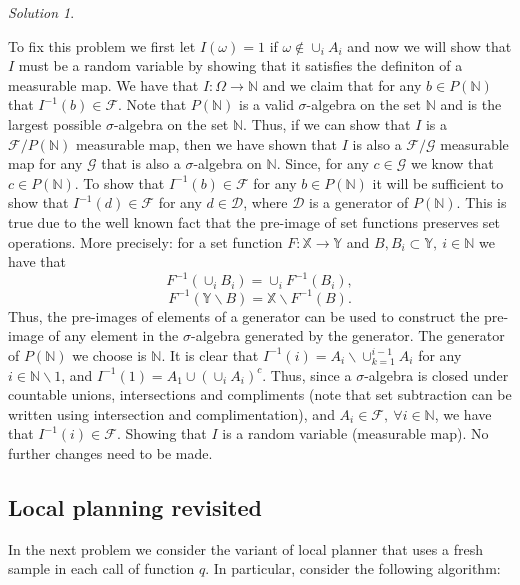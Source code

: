 \documentclass{article}
\DeclareMathOperator*{\1}{\mathbbm{1}}
\newcommand{\0}{\mathbf{0}}
\theoremstyle{definition}
\theoremstyle{remark}
\newtheorem*{solution*}{Solution}
\begin{document}
\begin{solution*}
\begin{enumerate}
  To fix this problem we first let $I(\omega) = 1$ if $\omega\not\in \cup_i A_i$ and now we will show that $I$ must be a random variable by showing that it satisfies the definiton of a measurable map.
  We have that $I: \Omega \to \mathbb{N}$ and we claim that for any $b \in P(\mathbb{N})$ that $I^{-1}(b) \in \mathcal{F}$.
  Note that $P(\mathbb{N})$ is a valid $\sigma$-algebra on the set $\mathbb{N}$ and is the largest possible $\sigma$-algebra on the set $\mathbb{N}$.
  Thus, if we can show that $I$ is a $\mathcal{F}/P(\mathbb{N})$ measurable map, then we have shown that $I$ is also a $\mathcal{F}/\mathcal{G}$ measurable map for any $\mathcal{G}$ that is also a $\sigma$-algebra on $\mathbb{N}$. 
  Since, for any $c \in \mathcal{G}$ we know that $c \in P(\mathbb{N})$.
  To show that $I^{-1}(b) \in \mathcal{F}$ for any $b \in P(\mathbb{N})$ it will be sufficient to show that $I^{-1}(d) \in \mathcal{F}$ for any $d \in \mathcal{D}$, where $\mathcal{D}$ is a generator of $P(\mathbb{N})$. 
  This is true due to the well known fact that the pre-image of set functions preserves set operations.
  More precisely: for a set function $F: \mathbb{X} \to \mathbb{Y}$ and $B, B_i \subset \mathbb{Y}, \ i \in \mathbb{N}$ we have that
  $$F^{-1}(\cup_i B_i) = \cup_i F^{-1}(B_i),$$
  $$F^{-1}(\mathbb{Y} \backslash B) = \mathbb{X} \backslash F^{-1}(B).$$
  Thus, the pre-images of elements of a generator can be used to construct the pre-image of any element in the $\sigma$-algebra generated by the generator.
  The generator of $P(\mathbb{N})$ we choose is $\mathbb{N}$.
  It is clear that $I^{-1}(i) = A_i \backslash \cup_{k=1}^{i-1} A_i$ for any $i \in \mathbb{N} \backslash 1$, and $I^{-1}(1) = A_1 \cup \left(\cup_i A_i\right)^c$.
  Thus, since a $\sigma$-algebra is closed under countable unions, intersections and compliments (note that set subtraction can be written using intersection and complimentation), and $A_i \in \mathcal{F}, \ \forall i \in \mathbb{N}$, we have that $I^{-1}(i) \in \mathcal{F}$. 
  Showing that $I$ is a random variable (measurable map).
  No further changes need to be made.

\end{enumerate}
\end{solution*}

\subsection*{Local planning revisited}
In the next problem we consider the variant of local planner that uses a fresh sample in each call of function $q$.
In particular, consider the following algorithm:
\end{document}
